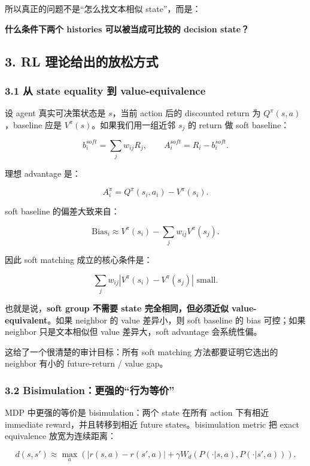 \documentclass[
  10pt,
]{ctexart}
\begin{document}
所以真正的问题不是``怎么找文本相似 state''，而是：

\textbf{什么条件下两个 histories 可以被当成可比较的 decision state？}

\subsection{3. RL
理论给出的放松方式}\label{rl-ux7406ux8bbaux7ed9ux51faux7684ux653eux677eux65b9ux5f0f}

\subsubsection{3.1 从 state equality 到
value-equivalence}\label{ux4ece-state-equality-ux5230-value-equivalence}

设 agent 真实可决策状态是 \(s\)，当前 action 后的 discounted return 为
\(Q^\pi(s,a)\)，baseline 应是 \(V^\pi(s)\)。如果我们用一组近邻 \(s_j\)
的 return 做 soft baseline：

\[
b_i^{soft}=\sum_j w_{ij}R_j,
\qquad
A_i^{soft}=R_i-b_i^{soft}.
\]

理想 advantage 是：

\[
A_i^\pi = Q^\pi(s_i,a_i)-V^\pi(s_i).
\]

soft baseline 的偏差大致来自：

\[
\mathrm{Bias}_i \approx V^\pi(s_i)-\sum_j w_{ij}V^\pi(s_j).
\]

因此 soft matching 成立的核心条件是：

\[
\sum_j w_{ij}|V^\pi(s_i)-V^\pi(s_j)| \text{ small}.
\]

也就是说，\textbf{soft group 不需要 state 完全相同，但必须近似
value-equivalent}。如果 neighbor 的 value 差异小，则 soft baseline 的
bias 可控；如果 neighbor 只是文本相似但 value 差异大，soft advantage
会系统性偏。

这给了一个很清楚的审计目标：所有 soft matching 方法都要证明它选出的
neighbor 有小的 future-return / value gap。

\subsubsection{3.2
Bisimulation：更强的``行为等价''}\label{bisimulationux66f4ux5f3aux7684ux884cux4e3aux7b49ux4ef7}

MDP 中更强的等价是 bisimulation：两个 state 在所有 action 下有相近
immediate reward，并且转移到相近 future states。bisimulation metric 把
exact equivalence 放宽为连续距离：

\[
d(s,s') \approx \max_a
\left(
|r(s,a)-r(s',a)|
+ \gamma W_d(P(\cdot|s,a),P(\cdot|s',a))
\right).
\]
\end{document}
